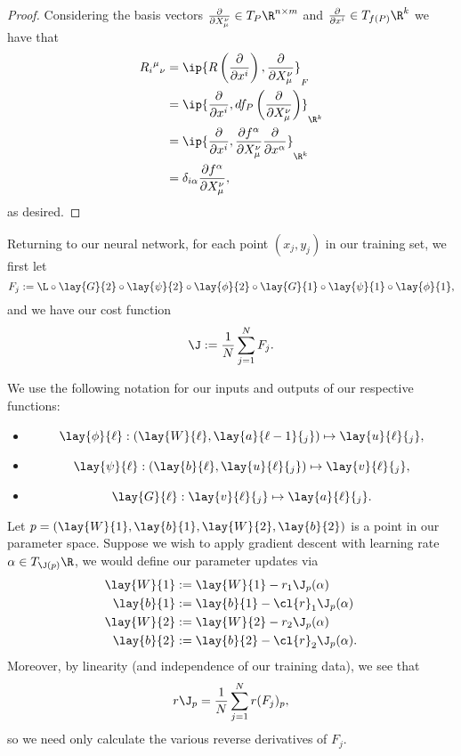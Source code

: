 \begin{proof}
	Considering the basis vectors $\frac{\partial}{\partial X^\nu_\mu}\in T_P\R^{n\times m}$ and $\frac{\partial}{\partial x^i}\in T_{f(P)}\R^k$ we have that
	\begin{align*}
		R_i{^\mu}{_\nu}&=\ip{R\left(\frac{\partial}{\partial x^i}\right), \frac{\partial}{\partial X^\nu_\mu}}_F\\
		&=\ip{\frac{\partial}{\partial x^i},df_P\left(\frac{\partial}{\partial X^\nu_\mu}\right)}_{\R^k}\\
		&=\ip{\frac{\partial}{\partial x^i},\frac{\partial f^\alpha}{\partial X^\nu_\mu}\frac{\partial}{\partial x^\alpha}}_{\R^k}\\
		&=\delta_{i\alpha}\frac{\partial f^\alpha}{\partial X^\nu_\mu},
	\end{align*}
	as desired.
\end{proof}



Returning to our neural network, for each point $(x_j,y_j)$ in our training set, we first let
$$F_j:=\L\circ\lay{G}{2}\circ\lay{\psi}{2}\circ\lay{\phi}{2}\circ\lay{G}{1}\circ\lay{\psi}{1}\circ\lay{\phi}{1},$$
and we have our cost function
$$\J:=\frac{1}{N}\sum_{j=1}^NF_j.$$

We use the following notation for our inputs and outputs of our respective functions:
\begin{itemize}
	\item $$\lay{\phi}{\ell}:(\lay{W}{\ell},\lay{a}{\ell-1}{_j})\mapsto \lay{u}{\ell}{_j},$$
	\item $$\lay{\psi}{\ell}:(\lay{b}{\ell},\lay{u}{\ell}{_j})\mapsto\lay{v}{\ell}{_j},$$
	\item $$\lay{G}{\ell}:\lay{v}{\ell}{_j}\mapsto\lay{a}{\ell}{_j}.$$
\end{itemize}

Let $p=(\lay{W}{1},\lay{b}{1},\lay{W}{2},\lay{b}{2})$ is a point in our parameter space.  Suppose we wish to apply gradient descent with learning rate $\alpha\in T_{\J(p)}\R$, we would define our parameter updates via
\begin{align*}
	\lay{W}{1}&:=\lay{W}{1}-r_1\J_p(\alpha)\\
	\lay{b}{1}&:=\lay{b}{1}-\cl{r}_1\J_p(\alpha)\\
	\lay{W}{2}&:=\lay{W}{2}-r_2\J_p(\alpha)\\
	\lay{b}{2}&:=\lay{b}{2}-\cl{r}_2\J_p(\alpha).
\end{align*}
Moreover, by linearity (and independence of our training data), we see that
$$r\J_p=\frac{1}{N}\sum_{j=1}^Nr(F_j)_p,$$
so we need only calculate the various reverse derivatives of $F_j$.

